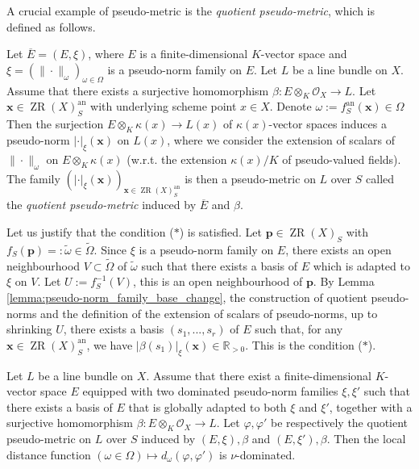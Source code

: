 \documentclass [11pt,reqno]{amsart}
\def\bR{{\mathbb{R}}}
\newcommand{\1}{\mathmybb{1}}
\def\cO{{\mathcal{O}}}
\def\an{\operatorname{an}}
\def\ZR{\operatorname{ZR}}
\def\tilde{\widetilde}
\begin{document}
\begin{example}
\label{example:pseudo-metric_family_quotient}
A crucial example of pseudo-metric is the \emph{quotient pseudo-metric}, which is defined as follows. 

Let $\overline{E}=(E,\xi)$, where $E$ is a finite-dimensional $K$-vector space and $\xi=(\|\cdot\|_{\omega})_{\omega\in\Omega}$ is a pseudo-norm family on $E$. Let $L$ be a line bundle on $X$. Assume that there exists a surjective homomorphism $\beta: E\otimes_{K}\cO_{X} \to L$. Let $\mathbf{x}\in \ZR(X)^{\an}_{S}$ with underlying scheme point $x\in X$. Denote $\omega:=f^{\an}_{S}(\mathbf{x})\in \Omega$ Then the surjection $E \otimes_{K} \kappa(x) \to L(x)$ of $\kappa(x)$-vector spaces induces a pseudo-norm $|\cdot|_{\xi}(\mathbf{x})$ on $L(x)$, where we consider the extension of scalars of $\|\cdot\|_{\omega}$ on $E\otimes_{K}\kappa(x)$  (w.r.t. the extension $\kappa(x)/K$ of pseudo-valued fields). The family $(|\cdot|_{\xi}(\mathbf{x}))_{\mathbf{x}\in\ZR(X)^{\an}_{S}}$ is then a pseudo-metric on $L$ over $S$ called the \emph{quotient pseudo-metric} induced by $\overline{E}$ and $\beta$. 

Let us justify that the condition ($\ast$) is satisfied. Let $\mathbf{p}\in\ZR(X)_{S}$ with $f_{S}(\mathbf{p})=:\tilde{\omega}\in\tilde{\Omega}$. Since $\xi$ is a pseudo-norm family on $E$, there exists an open neighbourhood $V\subset \tilde{\Omega}$ of $\tilde{\omega}$ such that there exists a basis of $E$ which is adapted to $\xi$ on $V$. Let $U:=f_{S}^{-1}(V)$, this is an open neighbourhood of $\mathbf{p}$. By Lemma \ref{lemma:pseudo-norm_family_base_change}, the construction of quotient pseudo-norms and the definition of the extension of scalars of pseudo-norms, up to shrinking $U$, there exists a basis $(s_{1},...,s_{r})$ of $E$ such that, for any $\mathbf{x}\in \ZR(X)^{\an}_{S}$, we have $|\beta(s_{1})|_{\xi}(\mathbf{x})\in \bR_{>0}$. This is the condition ($\ast$). 
\end{example}

\begin{proposition}
\label{prop:distance_quotient_pseudo-metric_families_dominated}
Let $L$ be a line bundle on $X$. Assume that there exist a finite-dimensional $K$-vector space $E$ equipped with two dominated pseudo-norm families $\xi,\xi'$ such that there exists a basis of $E$ that is globally adapted to both $\xi$ and $\xi'$, together with a surjective homomorphism $\beta :E\otimes_{K}\cO_{X}\to L$. Let $\varphi,\varphi'$ be respectively the quotient pseudo-metric on $L$ over $S$ induced by $(E,\xi),\beta$ and $(E,\xi'),\beta$. Then the local distance function $(\omega\in\Omega)\mapsto d_{\omega}(\varphi,\varphi')$ is $\nu$-dominated. 
\end{proposition}
\end{document}
